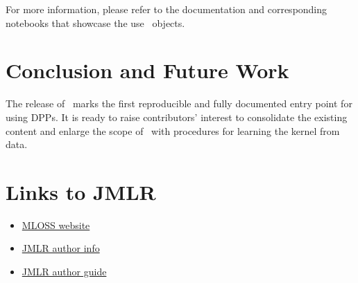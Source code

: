 \documentclass[twoside,11pt]{article}
\begin{document}
  For more information, please refer to the documentation and corresponding notebooks that showcase the use \DPPy\ objects.




\section{Conclusion and Future Work} %
\label{sec:conclusion_and_future_work}

The release of \DPPy\ marks the first reproducible and fully documented entry point for using DPPs. It is ready to raise contributors' interest to consolidate the existing content and enlarge the scope of \DPPy\ \eg with procedures for learning the kernel from data.


\newpage
{}


\section{Links to JMLR } %
\label{sec:links_to_jmlr_}

  \begin{itemize}
    \item \href{http://www.jmlr.org/mloss/mloss-info.html}{MLOSS website}
    \item \href{http://jmlr.csail.mit.edu/author-info.html}{JMLR author info}
    \item \href{http://www.jmlr.org/format/authors-guide.html}{JMLR author guide}
  \end{itemize}









\end{document}
